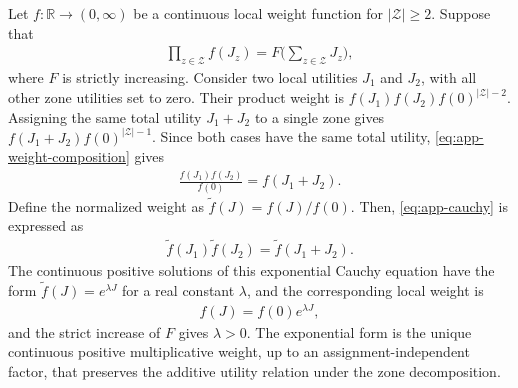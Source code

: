 \documentclass[journal]{IEEEtran}
\begin{document}
{Let $f:\mathbb{R}\rightarrow(0,\infty)$ be a continuous local weight function for $|\mathcal Z|\geq2$. Suppose that
\begin{align}
\prod_{z\in\mathcal Z}f(J_z)=F\!\Big(\sum_{z\in\mathcal Z}J_z\Big),
\label{eq:app-weight-composition}
\end{align}
where $F$ is strictly increasing. Consider two local utilities $J_1$ and $J_2$, with all other zone utilities set to zero. Their product
weight is $f(J_1)f(J_2)f(0)^{|\mathcal Z|-2}$. Assigning the same total utility $J_1+J_2$ to a single zone gives $f(J_1+J_2)f(0)^{|\mathcal Z|-1}$. Since both cases have the same total utility, \eqref{eq:app-weight-composition} gives
\begin{align}
\frac{f(J_1)f(J_2)}{f(0)}=f(J_1+J_2).
\label{eq:app-cauchy}
\end{align}
Define the normalized weight as $\widetilde f(J)=f(J)/f(0)$. Then, \eqref{eq:app-cauchy} is expressed as
\begin{align}
\widetilde f(J_1)\widetilde f(J_2)=\widetilde f(J_1+J_2).
\label{eq:app-cauchy-normalized}
\end{align}
The continuous positive solutions of this exponential Cauchy equation have the form $\widetilde f(J)=e^{\lambda J}$ for a real constant $\lambda$, and the corresponding local weight is
\begin{align}
f(J)=f(0)e^{\lambda J},
\label{eq:app-exp-weight}
\end{align}
and the strict increase of $F$ gives $\lambda>0$. The exponential form is the unique continuous positive multiplicative weight, up to an assignment-independent factor, that preserves the additive utility relation under the zone decomposition.

\vspace{-3mm}
}
\end{document}
